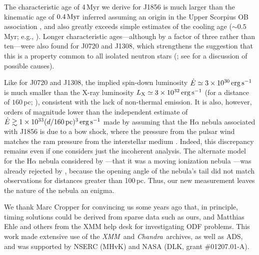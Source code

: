 \documentclass{emulateapj}\usepackage{apjfonts}
\newcommand{\cxo}{{\em Chandra}}
\newcommand{\xmm}{{\em XMM}}
\newcommand{\expnt}[2]{\ensuremath{#1 \times 10^{#2}}}   %
\begin{document}
The characteristic age of 4\,Myr we derive for J1856 is much larger
than the kinematic age of $0.4{\rm\,Myr}$ inferred assuming an origin
in the Upper Scorpius OB association \citep{wal01,vkk07}, and also
greatly exceeds simple estimates of the cooling age ($\sim 0.5\,$Myr;
e.g., \citealt{pgw06}).  Longer characteristic ages---although by a factor
of three rather than ten---were also found for J0720 and J1308, which
strengthens the suggestion that this is a property common to all
isolated neutron stars (; see  for
  a discussion of possible causes).

Like for J0720 and J1308, the implied spin-down luminosity $\dot
E\simeq3\times10^{30}{\rm\,erg\,s^{-1}}$ is much smaller than the
X-ray luminosity $L_{\rm X}\simeq\expnt{3}{32}{\rm\,erg\,s^{-1}}$ (for
a distance of $160\,$pc; \citealt{vkk07}), consistent with the lack of
non-thermal emission.  It is also, however, orders of magnitude lower
than the independent estimate of $\dot E\gtrsim
1\times10^{33}(d/160{\rm\,pc})^3{\rm\,erg\,s^{-1}}$ made by assuming
that the H$\alpha$ nebula associated with J1856 is due to a bow shock,
where the pressure from the pulsar wind matches the ram pressure from
the interstellar medium \citep{vkk01b}.  Indeed, this discrepancy
remains even if one considers just the incoherent analysis.  The
alternate model for the H$\alpha$ nebula considered by
\citet{vkk01b}---that it was a moving ionization nebula
\citep{bwm95}---was already rejected by \citet{kvka02}, because the
opening angle of the nebula's tail did not match observations for
distances greater than 100\,pc.  Thus, our new measurement leaves the
nature of the nebula an enigma.

\acknowledgements We thank Marc Cropper for convincing us some years
ago that, in principle, timing solutions could be derived from sparse
data such as ours, and Matthias Ehle and others from the XMM help desk
for investigating ODF problems.  This work made extensive use of the
\xmm\ and \cxo\ archives, as well as ADS, and was supported by NSERC
(MHvK) and NASA (DLK, grant \#01207.01-A).
\end{document}
